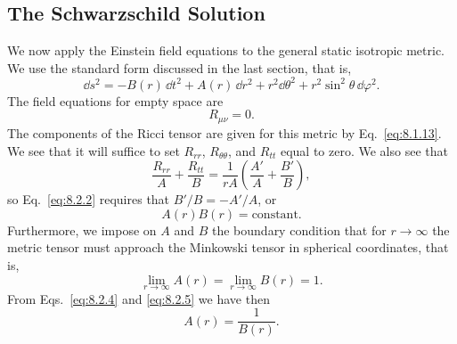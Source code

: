 
\subsection{The Schwarzschild Solution}\label{sec:8.2}

We now apply the Einstein field equations to the general static isotropic
metric. We use the standard form discussed in the last section, that is,
\begin{equation}
  \dd s^2
  =
  -B(r)\,\dd t^2+A(r)\,\dd r^2
  +r^2\dd\theta^2+r^2\sin^2\theta\,\dd\varphi^2.
  \tag{8.2.1}\label{eq:8.2.1}
\end{equation}
The field equations for empty space are
\begin{equation}
  R_{\mu\nu}=0.
  \tag{8.2.2}\label{eq:8.2.2}
\end{equation}
The components of the Ricci tensor are given for this metric by
Eq.~\eqref{eq:8.1.13}. We see that it will suffice to set
\(R_{rr}\), \(R_{\theta\theta}\), and \(R_{tt}\) equal to zero. We also
see that
\begin{equation}
  \frac{R_{rr}}{A}+\frac{R_{tt}}{B}
  =
  \frac{1}{rA}\left(\frac{A'}{A}+\frac{B'}{B}\right),
  \tag{8.2.3}\label{eq:8.2.3}
\end{equation}
so Eq.~\eqref{eq:8.2.2} requires that \(B'/B=-A'/A\), or
\begin{equation}
  A(r)B(r)=\text{constant}.
  \tag{8.2.4}\label{eq:8.2.4}
\end{equation}
Furthermore, we impose on \(A\) and \(B\) the boundary condition that for
\(r\to\infty\) the metric tensor must approach the Minkowski tensor in
spherical coordinates, that is,
\begin{equation}
  \lim_{r\to\infty}A(r)=\lim_{r\to\infty}B(r)=1.
  \tag{8.2.5}\label{eq:8.2.5}
\end{equation}
From Eqs.~\eqref{eq:8.2.4} and \eqref{eq:8.2.5} we have then
\begin{equation}
  A(r)=\frac{1}{B(r)}.
  \tag{8.2.6}\label{eq:8.2.6}
\end{equation}
